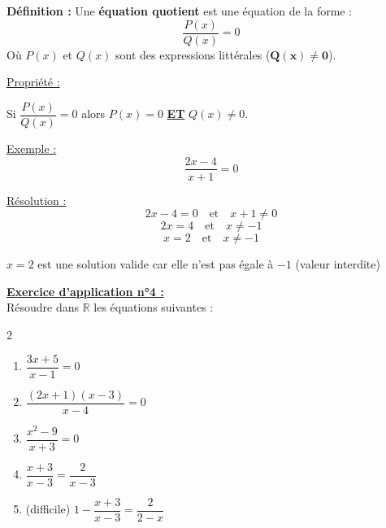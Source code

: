 \documentclass[12pt]{article}
\begin{document}
\vspace{5pt}

\begin{mdframed}[
    linewidth=1pt,
    roundcorner=5pt,
    linecolor=ForestGreen
]
{\color{ForestGreen}\textbf{Définition :}}  
Une \textbf{équation quotient} est une équation de la forme :
\[
\frac{P(x)}{Q(x)} = 0
\]
Où $P(x)$ et $Q(x)$ sont des expressions littérales ($\bm{Q(x) \neq 0}$).
\end{mdframed}

\vspace{10pt}

\begin{mdframed}[
    linewidth=1pt,
    roundcorner=5pt,
    linecolor=Red,
    innertopmargin=10pt,
]
{\color{red}\underline{Propriété :}
\begin{center}
    Si $\dfrac{P(x)}{Q(x)} = 0$ alors $P(x) = 0$ \textbf{\underline{ET}} $Q(x) \neq 0$.
\end{center}
}
\end{mdframed}

\vspace{10pt}

\underline{Exemple :}
\[
\frac{2x - 4}{x + 1} = 0
\]

\vspace{5pt}

\underline{Résolution :}
\[
2x - 4 = 0 \quad \text{et} \quad x + 1 \neq 0
\]
\[
2x = 4 \quad \text{et} \quad x \neq -1
\]
\[
x = 2 \quad \text{et} \quad x \neq -1
\]
\begin{center}
    $x = 2$ est une solution valide car elle n'est pas égale à $-1$ (valeur interdite)
\end{center}

\vspace{10pt}

\begin{mdframed}[
    linewidth=1pt,
    roundcorner=5pt,
    linecolor=RoyalBlue,
    innertopmargin=10pt,
    innerbottommargin=10pt
]
{\color{RoyalBlue}\textbf{\underline{Exercice d'application n°4 :}}}
\vspace{5pt}
\\
Résoudre dans $\mathbb{R}$ les équations suivantes :
\begin{multicols}{2}
    \begin{enumerate}
        \item $\dfrac{3x+5}{x-1} = 0$
        \vspace{5pt}
        \item $\dfrac{(2x+1)(x-3)}{x-4} = 0$
        \vspace{5pt}
        \item $\dfrac{x^2 - 9}{x+3} = 0$
        \vspace{5pt}
        \item $\dfrac{x+3}{x-3} = \dfrac{2}{x-3}$
        \vspace{5pt}
        \item (difficile) $1 - \dfrac{x+3}{x-3} = \dfrac{2}{2-x}$
    \end{enumerate}
\end{multicols}
\end{mdframed}
\end{document}

